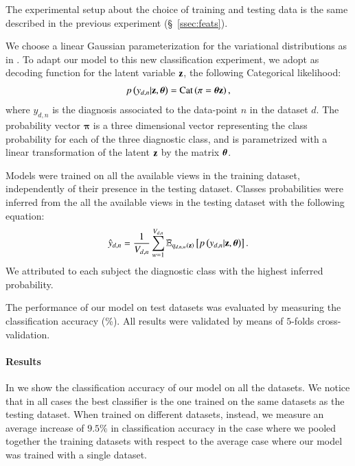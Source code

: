 The experimental setup about the choice of training and testing data is the same described in the previous experiment (\S~\ref{ssec:feats}).

We choose a linear Gaussian parameterization for the variational distributions as in .
To adapt our model to this new classification experiment, we adopt as decoding function for the latent variable $\mathbf{z}$, the following Categorical likelihood:
\begin{align}
\label{eq:classifier}
p\left(y_{d,n}|\mathbf{z},\boldsymbol{\theta}\right) = \operatorname{Cat}\left(\mathbf{\pi}=\boldsymbol{\theta}\mathbf{z}\right),
\end{align}
where $y_{d,n}$ is the diagnosis associated to the data-point $n$ in the dataset $d$.
The probability vector $\mathbf{\pi}$ is a three dimensional vector representing the class probability for each of the three diagnostic class, and is parametrized with a linear transformation of the latent $\mathbf{z}$ by the matrix $\boldsymbol{\theta}$.

Models were trained on all the available views in the training dataset, independently of their presence in the testing dataset.
Classes probabilities were inferred from the all the available views in the testing dataset with the following equation:
\begin{equation}\label{eq:reconstructiony}
\begin{aligned}
\hat{y}_{d,n} = \frac{1}{V_{d, n}} \sum_{w=1}^{V_{d, n}} \operatorname{\mathbb{E}}_{q_{d,n,w}(\mathbf{z})}\left[p\left(y_{d,n}|\mathbf{z},\boldsymbol{\theta}\right)\right].
\end{aligned}
\end{equation}
We attributed to each subject the diagnostic class with the highest inferred probability.

The performance of our model on test datasets was evaluated by measuring the classification accuracy (\%).
All results were validated by means of $5$-folds cross-validation.

\paragraph{Results}
In  we show the classification accuracy of our model on all the datasets.
We notice that in all cases the best classifier is the one trained on the same datasets as the testing dataset.
When trained on different datasets, instead, we measure an average increase of $9.5\%$ in classification accuracy in the case where we pooled together the training datasets with respect to the average case where our model was trained with a single dataset.
